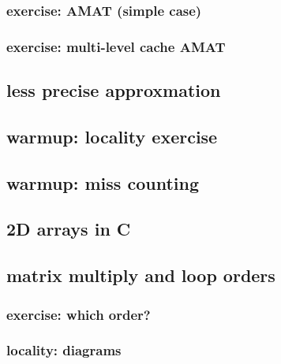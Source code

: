 \subsubsection{exercise: AMAT (simple case)}


\subsubsection{exercise: multi-level cache AMAT}


\subsection{less precise approxmation}


\subsection{warmup: locality exercise}  %


\subsection{warmup: miss counting}


\subsection{2D arrays in C}



\subsection{matrix multiply and loop orders}

%


\subsubsection{exercise: which order?}

\subsubsection{locality: diagrams}



